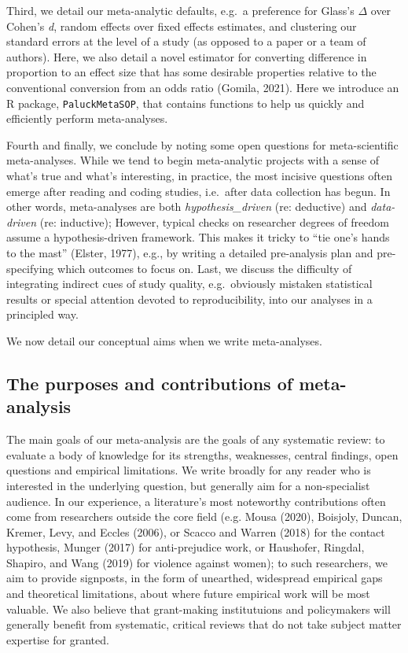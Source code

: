 \documentclass[
  man]{apa6}
\begin{document}
Third, we detail our meta-analytic defaults, e.g.~a preference for Glass's \(\Delta\) over Cohen's \emph{d}, random effects over fixed effects estimates, and clustering our standard errors at the level of a study (as opposed to a paper or a team of authors). Here, we also detail a novel estimator for converting difference in proportion to an effect size that has some desirable properties relative to the conventional conversion from an odds ratio (Gomila, 2021). Here we introduce an R package, \texttt{PaluckMetaSOP}, that contains functions to help us quickly and efficiently perform meta-analyses.

Fourth and finally, we conclude by noting some open questions for meta-scientific meta-analyses. While we tend to begin meta-analytic projects with a sense of what's true and what's interesting, in practice, the most incisive questions often emerge after reading and coding studies, i.e.~after data collection has begun. In other words, meta-analyses are both \emph{hypothesis\_driven} (re: deductive) and \emph{data-driven} (re: inductive); However, typical checks on researcher degrees of freedom assume a hypothesis-driven framework. This makes it tricky to ``tie one's hands to the mast'' (Elster, 1977), e.g., by writing a detailed pre-analysis plan and pre-specifying which outcomes to focus on. Last, we discuss the difficulty of integrating indirect cues of study quality, e.g.~obviously mistaken statistical results or special attention devoted to reproducibility, into our analyses in a principled way.

We now detail our conceptual aims when we write meta-analyses.

\subsection{The purposes and contributions of meta-analysis}\label{the-purposes-and-contributions-of-meta-analysis}

The main goals of our meta-analysis are the goals of any systematic review: to evaluate a body of knowledge for its strengths, weaknesses, central findings, open questions and empirical limitations. We write broadly for any reader who is interested in the underlying question, but generally aim for a non-specialist audience. In our experience, a literature's most noteworthy contributions often come from researchers outside the core field (e.g. Mousa (2020), Boisjoly, Duncan, Kremer, Levy, and Eccles (2006), or Scacco and Warren (2018) for the contact hypothesis, Munger (2017) for anti-prejudice work, or Haushofer, Ringdal, Shapiro, and Wang (2019) for violence against women); to such researchers, we aim to provide signposts, in the form of unearthed, widespread empirical gaps and theoretical limitations, about where future empirical work will be most valuable. We also believe that grant-making institutuions and policymakers will generally benefit from systematic, critical reviews that do not take subject matter expertise for granted.
\end{document}
